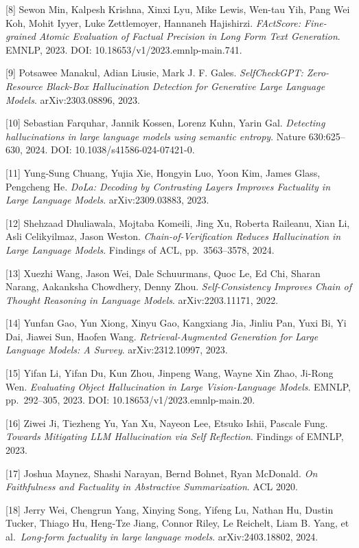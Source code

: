 {[}8{]} Sewon Min, Kalpesh Krishna, Xinxi Lyu, Mike Lewis, Wen-tau Yih, Pang Wei Koh, Mohit Iyyer, Luke Zettlemoyer, Hannaneh Hajishirzi. \emph{FActScore: Fine-grained Atomic Evaluation of Factual Precision in Long Form Text Generation}. EMNLP, 2023. DOI: 10.18653/v1/2023.emnlp-main.741.

{[}9{]} Potsawee Manakul, Adian Liusie, Mark J. F. Gales. \emph{SelfCheckGPT: Zero-Resource Black-Box Hallucination Detection for Generative Large Language Models}. arXiv:2303.08896, 2023.

{[}10{]} Sebastian Farquhar, Jannik Kossen, Lorenz Kuhn, Yarin Gal. \emph{Detecting hallucinations in large language models using semantic entropy}. Nature 630:625--630, 2024. DOI: 10.1038/s41586-024-07421-0.

{[}11{]} Yung-Sung Chuang, Yujia Xie, Hongyin Luo, Yoon Kim, James Glass, Pengcheng He. \emph{DoLa: Decoding by Contrasting Layers Improves Factuality in Large Language Models}. arXiv:2309.03883, 2023.

{[}12{]} Shehzaad Dhuliawala, Mojtaba Komeili, Jing Xu, Roberta Raileanu, Xian Li, Asli Celikyilmaz, Jason Weston. \emph{Chain-of-Verification Reduces Hallucination in Large Language Models}. Findings of ACL, pp.~3563--3578, 2024.

{[}13{]} Xuezhi Wang, Jason Wei, Dale Schuurmans, Quoc Le, Ed Chi, Sharan Narang, Aakanksha Chowdhery, Denny Zhou. \emph{Self-Consistency Improves Chain of Thought Reasoning in Language Models}. arXiv:2203.11171, 2022.

{[}14{]} Yunfan Gao, Yun Xiong, Xinyu Gao, Kangxiang Jia, Jinliu Pan, Yuxi Bi, Yi Dai, Jiawei Sun, Haofen Wang. \emph{Retrieval-Augmented Generation for Large Language Models: A Survey}. arXiv:2312.10997, 2023.

{[}15{]} Yifan Li, Yifan Du, Kun Zhou, Jinpeng Wang, Wayne Xin Zhao, Ji-Rong Wen. \emph{Evaluating Object Hallucination in Large Vision-Language Models}. EMNLP, pp.~292--305, 2023. DOI: 10.18653/v1/2023.emnlp-main.20.

{[}16{]} Ziwei Ji, Tiezheng Yu, Yan Xu, Nayeon Lee, Etsuko Ishii, Pascale Fung. \emph{Towards Mitigating LLM Hallucination via Self Reflection}. Findings of EMNLP, 2023.

{[}17{]} Joshua Maynez, Shashi Narayan, Bernd Bohnet, Ryan McDonald. \emph{On Faithfulness and Factuality in Abstractive Summarization}. ACL 2020.

{[}18{]} Jerry Wei, Chengrun Yang, Xinying Song, Yifeng Lu, Nathan Hu, Dustin Tucker, Thiago Hu, Heng-Tze Jiang, Connor Riley, Le Reichelt, Liam B. Yang, et al.~\emph{Long-form factuality in large language models}. arXiv:2403.18802, 2024.

